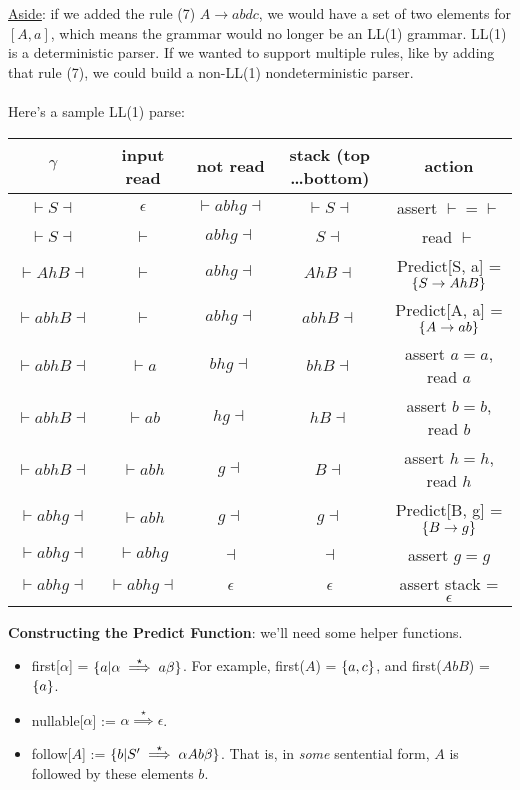 \documentclass[]{article}
\DeclarePairedDelimiter{\set}{\lbrace}{\rbrace}
\theoremstyle{definition}
\begin{document}
				\underline{Aside}: if we added the rule (7) $A \to abdc$, we would have a set of two elements for $[A, a]$, which means the grammar would no longer be an LL(1) grammar. LL(1) is a deterministic parser. If we wanted to support multiple rules, like by adding that rule (7), we could build a non-LL(1) nondeterministic parser. 
				\\ \\
				Here's a sample LL(1) parse:
				\begin{center}
					\begin{tabular}{|c|c|c|c|c|}
						\hline
						$\gamma$ & input read & not read & stack (top \ldots bottom) & action \\ \hline
						$\vdash S \dashv$ & $\epsilon$ & $\vdash abhg \dashv$ & $\vdash S \dashv$ & assert $\vdash = \vdash$ \\
						$\vdash S \dashv$ & $\vdash$ & $abhg \dashv$ & $S \dashv$ & read $\vdash$ \\
						$\vdash AhB \dashv$ & $\vdash$ & $abhg \dashv$ & $AhB \dashv$ & Predict[S, a] = $\set{S \to AhB}$ \\
						$\vdash abhB \dashv$ & $\vdash$ & $abhg \dashv$ & $abhB \dashv$ & Predict[A, a] = $\set{A \to ab}$ \\
						$\vdash abhB \dashv$ & $\vdash a$ & $bhg \dashv$ & $bhB \dashv$ & assert $a = a$, read $a$ \\
						$\vdash abhB \dashv$ & $\vdash ab$ & $hg \dashv$ & $hB \dashv$ & assert $b = b$, read $b$ \\
						$\vdash abhB \dashv$ & $\vdash abh$ & $g \dashv$ & $B \dashv$ & assert $h = h$, read $h$ \\
						$\vdash abhg \dashv$ & $\vdash abh$ & $g \dashv$ & $g \dashv$ & Predict[B, g] = $\set{B \to g}$ \\
						$\vdash abhg \dashv$ & $\vdash abhg$ & $\dashv$ & $\dashv$ & assert $g = g$ \\
						$\vdash abhg \dashv$ & $\vdash abhg \dashv$ & $\epsilon$ & $\epsilon$ & assert stack = $\epsilon$ \\ \hline
					\end{tabular}
				\end{center}
	

				\textbf{Constructing the Predict Function}: we'll need some helper functions.
				\begin{itemize}
					\item first[$\alpha$] = $\set{a | \alpha \stackrel{\star}{\implies} a \beta}$. For example, first($A$) = $\set{a, c}$, and first($AbB$) = $\set{a}$.
					\item nullable[$\alpha$] := $\alpha \stackrel{\star}{\implies} \epsilon$.
					\item follow[$A$] := $\set{b | S' \stackrel{\star}{\implies} \alpha A b \beta}$. That is, in \emph{some} sentential form, $A$ is followed by these elements $b$.
				\end{itemize}
\end{document}
